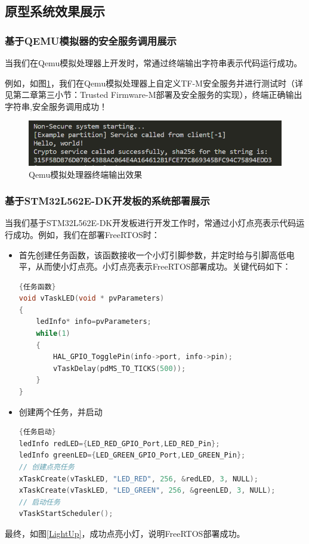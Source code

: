 \documentclass[UTF8,12pt,a4paper]{ctexart}
\numberwithin{figure}{section}
\begin{document}
\subsection{原型系统效果展示}
\subsubsection{基于QEMU模拟器的安全服务调用展示}
\par 当我们在Qemu模拟处理器上开发时，常通过终端输出字符串表示代码运行成功。
\par 例如，如图\ref{terminal}，我们在Qemu模拟处理器上自定义TF-M安全服务并进行测试时（详见第二章第三小节：Trusted Firmware-M部署及安全服务的实现），终端正确输出字符串,安全服务调用成功！

\begin{figure}[H]
    \centering
    \includegraphics[scale=1.1]{graph/terminal output.png}
    \caption{Qemu模拟处理器终端输出效果}
    \label{terminal}
\end{figure}

\subsubsection{基于STM32L562E-DK开发板的系统部署展示}
\par 当我们基于STM32L562E-DK开发板进行开发工作时，常通过小灯点亮表示代码运行成功。例如，我们在部署FreeRTOS时：
\begin{itemize}
    \item[1)]首先创建任务函数，该函数接收一个小灯引脚参数，并定时给与引脚高低电平，从而使小灯点亮。小灯点亮表示FreeRTOS部署成功。关键代码如下：
    \begin{lstlisting}[language=C]{任务函数}
void vTaskLED(void * pvParameters) 
{ 
    ledInfo* info=pvParameters; 
    while(1) 
    { 
        HAL_GPIO_TogglePin(info->port, info->pin); 
        vTaskDelay(pdMS_TO_TICKS(500)); 
    } 
} \end{lstlisting}
    \item[2)]创建两个任务，并启动
    \begin{lstlisting}[language=C]{任务启动}
ledInfo redLED={LED_RED_GPIO_Port,LED_RED_Pin}; 
ledInfo greenLED={LED_GREEN_GPIO_Port,LED_GREEN_Pin}; 
// 创建点亮任务 
xTaskCreate(vTaskLED, "LED_RED", 256, &redLED, 3, NULL); 
xTaskCreate(vTaskLED, "LED_GREEN", 256, &greenLED, 3, NULL); 
// 启动任务 
vTaskStartScheduler(); \end{lstlisting}
\end{itemize}
最终，如图\ref{LightUp}，成功点亮小灯，说明FreeRTOS部署成功。
\end{document}
